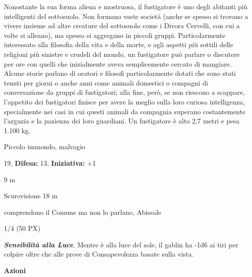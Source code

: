 \begin{multicols}{2}
{Nonostante la sua forma aliena e mostruosa, il fustigatore è uno degli abitanti più intelligenti del sottosuolo. Non formano vaste società (anche se spesso si trovano a vivere insieme ad altre creature del sottosuolo come i Divora Cervelli, con cui a volte si alleano), ma spesso si aggregano in piccoli gruppi. Particolarmente interessato alla filosofia della vita e della morte, e agli aspetti più sottili delle religioni più sinistre e crudeli del mondo, un fustigatore può parlare o discutere per ore con quelli che inizialmente aveva semplicemente cercato di mangiare. Alcune storie parlano di oratori e filosofi particolarmente dotati che sono stati tenuti per giorni o anche anni come animali domestici o compagni di conversazione da gruppi di fustigatori; alla fine, però, se non riescono a scappare, l'appetito dei fustigatori finisce per avere la meglio sulla loro curiosa intelligenza, specialmente nei casi in cui questi animali da compagnia superano costantemente l'arguzia e la pazienza dei loro guardiani.
Un fustigatore è alto 2,7 metri e pesa 1.100 kg.


\noindent
\begin{description}[noitemsep, topsep=0pt, parsep=0pt, partopsep=0pt, leftmargin=0cm, labelwidth=2.2cm]
	\item[\textbf{Taglia/Tipo:}] Piccolo immondo, malvagio
	\item[\textbf{Caratt.:}] 
	\item[\textbf{Punti Ferita:}] 19,  \textbf{Difesa:} 13,  \textbf{Iniziativa:} +1
	\item[\textbf{Movimento:}] 9 m
	\item[\textbf{Tiri Salvez.:}] 
	\item[\textbf{Sensi:}] Scurovisione 18 m
	\item[\textbf{Linguaggi:}] comprendono il Comune ma non lo parlano, Abissale
	\item[\textbf{Sfida:}] 1/4 (50 PX)\smallskip
\end{description}

\emph{\textbf{Sensibilità alla Luce}}. Mentre è alla luce del sole, il gablin ha -1d6 ai tiri per colpire oltre che alle prove di Consapevolezza basate sulla vista.

\textbf{Azioni}

}
\end{multicols}
